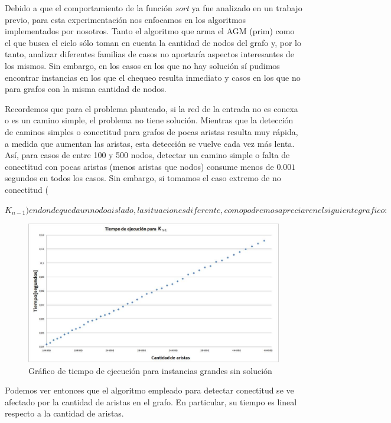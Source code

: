 \documentclass[11pt, a4paper, twoside]{article}
\begin{document}
Debido a que el comportamiento de la función \textit{sort} ya fue analizado en un trabajo previo, para esta experimentación nos enfocamos en los algoritmos implementados por nosotros. Tanto el algoritmo que arma el AGM (prim) como el que busca el ciclo sólo toman en cuenta la cantidad de nodos del grafo y, por lo tanto, analizar diferentes familias de casos no aportaría aspectos interesantes de los mismos. Sin embargo, en los casos en los que no hay solución sí pudimos encontrar instancias en los que el chequeo resulta inmediato y casos en los que no para grafos con la misma cantidad de nodos. 

Recordemos que para el problema planteado, si la red de la entrada no es conexa o es un camino simple, el problema no tiene solución. Mientras que la detección de caminos simples o conectitud para grafos de pocas aristas resulta muy rápida, a medida que aumentan las aristas, esta detección se vuelve cada vez más lenta. Así, para casos de entre 100 y 500 nodos, detectar un camino simple o  falta de conectitud con pocas aristas (menos aristas que nodos) consume menos de $0.001$ segundos en todos los casos. Sin embargo, si tomamos el caso extremo de no conectitud (

$K_{n-1}) en donde queda un nodo aislado, la situacion es diferente, como podremos apreciar en el siguiente grafico:$

\begin{figure}[H]
\centering
\includegraphics[scale=0.5]{imagenes/graph2.jpg}
\caption{Gráfico de tiempo de ejecución para instancias grandes sin solución}
\end{figure}


Podemos ver entonces que el algoritmo empleado para detectar conectitud se ve afectado por la cantidad de aristas en el grafo. En particular, su tiempo es lineal respecto a la cantidad de aristas.




\end{document}
